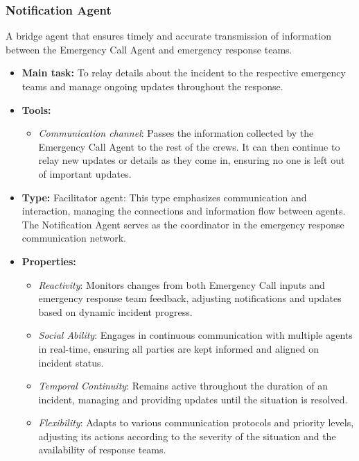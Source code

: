 \subsubsection{Notification Agent}

A bridge agent that ensures timely and accurate transmission of information between the Emergency Call Agent and emergency response teams.

\begin{itemize}
    \item \textbf{Main task:} To relay details about the incident to the respective emergency teams and manage ongoing updates throughout the response.
    \item \textbf{Tools:}
    \begin{itemize}
        \item \emph{Communication channel}: Passes the information collected by the Emergency Call Agent to the rest of the crews. It can then continue to relay new updates or details as they come in, ensuring no one is left out of important updates.
    \end{itemize}
    \item \textbf{Type:} Facilitator agent: This type emphasizes communication and interaction, managing the connections and information flow between agents. The Notification Agent serves as the coordinator in the emergency response communication network.
    \item \textbf{Properties:}
    \begin{itemize}
        \item \emph{Reactivity}: Monitors changes from both Emergency Call inputs and emergency response team feedback, adjusting notifications and updates based on dynamic incident progress.
        \item \emph{Social Ability}: Engages in continuous communication with multiple agents in real-time, ensuring all parties are kept informed and aligned on incident status.
        \item \emph{Temporal Continuity}: Remains active throughout the duration of an incident, managing and providing updates until the situation is resolved.
        \item \emph{Flexibility}: Adapts to various communication protocols and priority levels, adjusting its actions according to the severity of the situation and the availability of response teams.
    \end{itemize}
\end{itemize}
